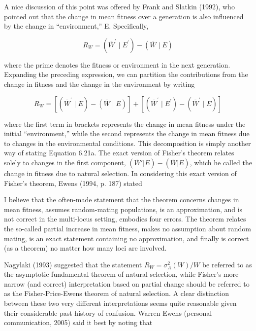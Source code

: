 \documentclass{article}
\begin{document}
A nice discussion of this point was offered by Frank and Slatkin (1992), who pointed out that the change in mean fitness over a generation is also influenced by the change in “environment,” E. Specifically,

\begin{equation}
R_{W}=\left(\overline{W}^{\prime}\mid E^{\prime}\right)-\left(\overline{W}\mid E\right)
\tag{6.22a}
\label{eq:6_22a}
\end{equation}

where the prime denotes the fitness or environment in the next generation. Expanding the preceding expression, we can partition the contributions from the change in fitness and the change in the environment by writing

\begin{equation}
R_{W}=\left[\left(\overline{W}^{\prime}\mid E\right)-\left(\overline{W}\mid E\right)\right]+\left[\left(\overline{W}^{\prime}\mid E^{\prime}\right)-\left(\overline{W}^{\prime}\mid E\right)\right]
\tag{6.22b}
\label{eq:6_22b}
\end{equation}

where the first term in brackets represents the change in mean fitness under the initial “environment,” while the second represents the change in mean fitness due to changes in the environmental conditions. This decomposition is simply another way of stating Equation 6.21a. The exact version of Fisher’s theorem relates solely to changes in the first component,  $ (\overline{W}'|E)-(\overline{W}|E) $, which he called the change in fitness due to natural selection. In considering this exact version of Fisher’s theorem, Ewens (1994, p. 187) stated

I believe that the often-made statement that the theorem concerns changes in mean fitness, assumes random-mating populations, is an approximation, and is not correct in the multi-locus setting, embodies four errors. The theorem relates the so-called partial increase in mean fitness, makes no assumption about random mating, is an exact statement containing no approximation, and finally is correct (as a theorem) no matter how many loci are involved.

Nagylaki (1993) suggested that the statement  $ R_W = \sigma_A^2(W)/W $ be referred to as the asymptotic fundamental theorem of natural selection, while Fisher's more narrow (and correct) interpretation based on partial change should be referred to as the Fisher-Price-Ewens theorem of natural selection. A clear distinction between these two very different interpretations seems quite reasonable given their considerable past history of confusion. Warren Ewens (personal communication, 2005) said it best by noting that
\end{document}

